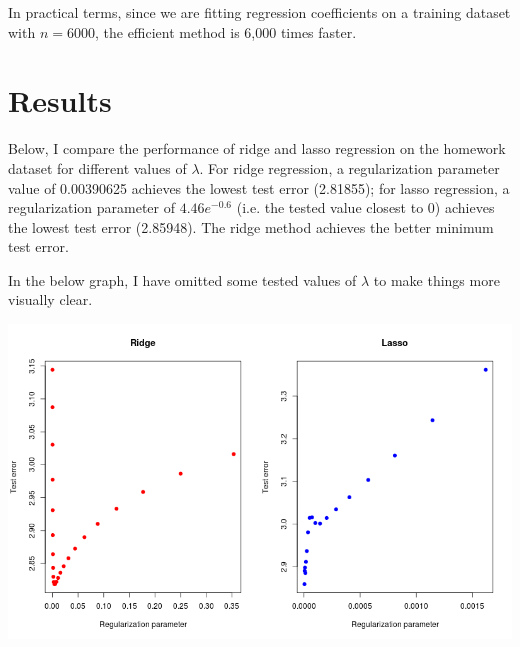 \documentclass{article}
\begin{document}
In practical terms, since we are fitting regression coefficients on a training
dataset with $n=6000$, the efficient method is 6,000 times faster.

\section*{Results}

Below, I compare the performance of ridge and lasso regression on the homework
dataset for different values of $\lambda$. For ridge regression, a
regularization parameter value of 0.00390625 achieves the lowest test error
(2.81855); for lasso regression, a regularization parameter of $4.46e^{-0.6}$
(i.e. the tested value closest to 0) achieves the lowest test error (2.85948).
The ridge method achieves the better minimum test error. 

In the below graph, I have omitted some tested values of $\lambda$ to make
things more visually clear.

\includegraphics[scale=0.5]{foo}
\end{document}
